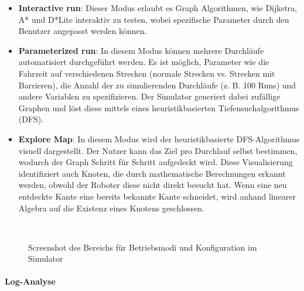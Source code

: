 \documentclass[main.tex]{subfiles} %
\begin{document}
\begin{itemize}
  \item \textbf{Interactive run}:
    Dieser Modus erlaubt es Graph Algorithmen, wie Dijkstra, A* und 
    D*Lite interaktiv zu testen, wobei spezifische Parameter durch 
    den Benutzer angepasst werden können.

  \item \textbf{Parameterized run}:
    In diesem Modus können mehrere Durchläufe automatisiert
    durchgeführt werden. Es ist möglich, Parameter wie die Fahrzeit
    auf verschiedenen Strecken (normale Strecken vs. Strecken mit
    Barrieren), die Anzahl der zu simulierenden Durchläufe (z. B. 100
    Runs) und andere Variablen zu spezifizieren. Der Simulator
    generiert dabei zufällige Graphen und löst diese mittels eines
    heuristikbasierten Tiefensuchalgorithmus (DFS).

  \item \textbf{Explore Map}:
    In diesem Modus wird der heuristikbasierte DFS-Algorithmus
    visuell dargestellt. Der Nutzer kann das Ziel pro Durchlauf
    selbst bestimmen, wodurch der Graph Schritt für Schritt
    aufgedeckt wird. Diese Visualisierung identifiziert auch Knoten,
    die durch mathematische Berechnungen erkannt werden, obwohl der
    Roboter diese nicht direkt besucht hat. Wenn eine neu entdeckte
    Kante eine bereits bekannte Kante schneidet, wird anhand linearer
    Algebra auf die Existenz eines Knotens geschlossen.
\end{itemize}

\begin{figure}[H]
  \centering
  \caption{Screenshot des Bereichs für Betriebsmodi und
  Konfiguration im Simulator}~\label{fig:DashboardConfig}
\end{figure}

\paragraph{Log-Analyse}
\end{document}
